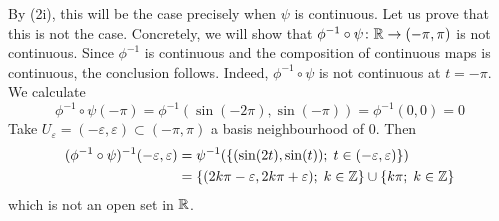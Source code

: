 \documentclass[a4paper, 12pt]{article}
\begin{document}
\begin{Exercise}
\begin{enumerate}[label=(\roman*)]
            By (2i), this will be the case precisely when $\psi$ is continuous.
            Let us prove that this is not the case.
            Concretely, we will show that $\phi^{-1}\circ\psi\colon \mathbb{R} \to (-\pi, \pi)$ is not continuous.
            Since $\phi^{-1}$ is continuous and the composition of continuous maps is continuous, the conclusion follows.
            Indeed, $\phi^{-1}\circ\psi$ is not continuous at $t = -\pi$.
            We calculate
            \[
                \phi^{-1}\circ\psi(-\pi) = \phi^{-1}(\sin(-2\pi), \sin(-\pi)) = \phi^{-1}(0, 0) = 0
            \]
            Take $U_\varepsilon = (-\varepsilon, \varepsilon) \subset (-\pi, \pi)$ a basis neighbourhood of $0$.
            Then
            \begin{align*}
                (\phi^{-1}\circ\psi)^{-1}(-\varepsilon, \varepsilon)
                &= \psi^{-1}(\left\{ (\sin(2t), \sin(t)) ; \; t \in (-\varepsilon, \varepsilon) \right\}) \\
                &= \left\{ (2k\pi -\varepsilon, 2k\pi + \varepsilon) ;\; k \in \mathbb{Z} \right\} \cup \left\{ k\pi ; \; k \in \mathbb{Z} \right\}
            \end{align*}
            which is not an open set in $\mathbb{R}$.
    \end{enumerate}
\end{Exercise}
\end{document}
